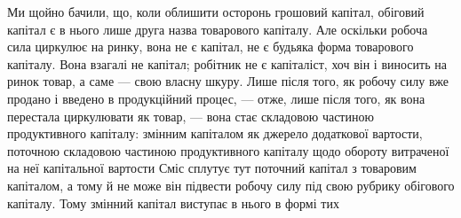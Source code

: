 Ми щойно бачили, що, коли облишити осторонь грошовий капітал,
обіговий капітал є в нього лише друга назва товарового капіталу. Але
оскільки робоча сила циркулює на ринку, вона не є капітал, не є будьяка
форма товарового капіталу. Вона взагалі не капітал; робітник не є
капіталіст, хоч він і виносить на ринок товар, а саме — свою власну шкуру.
Лише після того, як робочу силу вже продано і введено в продукційний
процес, — отже, лише після того, як вона перестала циркулювати
як товар, — вона стає складовою частиною продуктивного капіталу: змінним
капіталом як джерело додаткової вартости, поточною складовою
частиною продуктивного капіталу щодо обороту витраченої на неї капітальної
вартости Сміс сплутує тут поточний капітал з товаровим капіталом,
а тому й не може він підвести робочу силу під свою рубрику обігового
капіталу. Тому змінний капітал виступає в нього в формі тих
\parbreak{}  %
